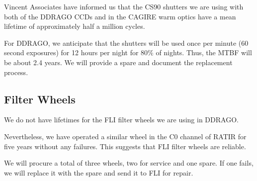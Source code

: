 \documentclass{article}
\begin{document}
Vincent Associates have informed us that the CS90 shutters we are using with both of the DDRAGO CCDs and in the CAGIRE warm optics have a mean lifetime of approximately half a million cycles.

For DDRAGO, we anticipate that the shutters will be used once per minute (60 second exposures) for 12 hours per night for 80\% of nights. Thus, the MTBF will be about 2.4 years. We will provide a spare and document the replacement process.




\subsection{Filter Wheels}

We do not have lifetimes for the FLI filter wheels we are using in DDRAGO.

Nevertheless, we have operated a similar wheel in the C0 channel of RATIR for five years without any failures. This suggests that FLI filter wheels are reliable.

We will procure a total of three wheels, two for service and one spare. If one fails, we will replace it with the spare and send it to FLI for repair.



\end{document}
